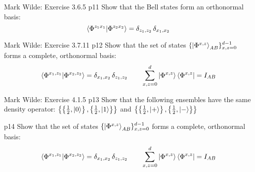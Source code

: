 \documentclass[a4paper, 11pt]{article}
\begin{document}
\begin{problem}{%
		Mark Wilde: Exercise 3.6.5
	}{p11%
	}
	Show that the Bell states form an orthonormal basis: $$\bra{\Phi^{z_1x_1}}\ket{\Phi^{z_2x_2}}=\delta_{z_1,z_2}\,\delta_{x_1,x_2}$$
\end{problem}


\begin{problem}{%
		Mark Wilde: Exercise 3.7.11
	}{p12%
	}
	 Show that the set of states $\{\ket{\Phi^{x,z}}_{AB}\}^{d-1}_{x,z=0}$ forms a complete, orthonormal basis:$$\bra{\Phi^{x_1,z_1}}\ket{\Phi^{x_2,z_2}}=\delta_{x_1,x_2}\,\delta_{z_1,z_2}\qquad \sum_{x,z=0}^d\ket{\Phi^{x,z}}\bra{\Phi^{x,z}}=I_{AB}$$
\end{problem}


\begin{problem}{%
		Mark Wilde: Exercise 4.1.5
	}{p13%
	}
	 Show that the following ensembles have the same density operator: $\left\{\left\{\frac12,\ket{0}\right\},\left\{\frac12,\ket{1}\right\}\right\}$ and $\left\{\left\{\frac12,\ket{+}\right\},\left\{\frac12,\ket{-}\right\}\right\}$
\end{problem}


\begin{problem}{%
	}{p14%
	}
	Show that the set of states $\{\ket{\Phi^{x,z}}_{AB}\}^{d-1}_{x,z=0}$ forms a complete, orthonormal basis:$$\bra{\Phi^{x_1,z_1}}\ket{\Phi^{x_2,z_2}}=\delta_{x_1,x_2}\,\delta_{z_1,z_2}\qquad \sum_{x,z=0}^d\ket{\Phi^{x,z}}\bra{\Phi^{x,z}}=I_{AB}$$
\end{problem}
\end{document}
